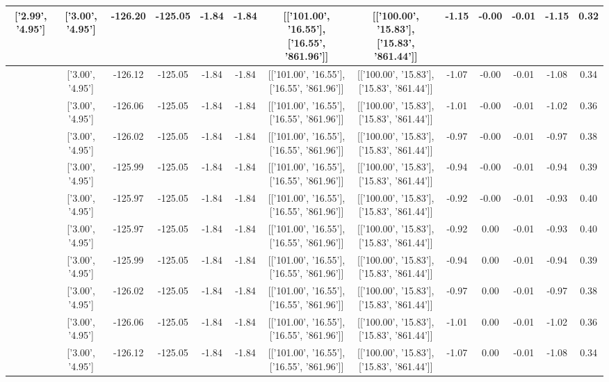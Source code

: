 \begin{table}[htbp]
\begin{adjustbox}{angle=90}
\begin{tabular}{|c|c|c|c|c|c|c|c|c|c|c|c|c|}
 ['2.99', '4.95'] & ['3.00', '4.95'] & -126.20 & -125.05 & -1.84 & -1.84 & [['101.00', '16.55'], ['16.55', '861.96']] & [['100.00', '15.83'], ['15.83', '861.44']] & -1.15 & -0.00 & -0.01 & -1.15 & 0.32\\ \hline
 ['2.99', '4.95'] & ['3.00', '4.95'] & -126.12 & -125.05 & -1.84 & -1.84 & [['101.00', '16.55'], ['16.55', '861.96']] & [['100.00', '15.83'], ['15.83', '861.44']] & -1.07 & -0.00 & -0.01 & -1.08 & 0.34\\ \hline
 ['3.00', '4.95'] & ['3.00', '4.95'] & -126.06 & -125.05 & -1.84 & -1.84 & [['101.00', '16.55'], ['16.55', '861.96']] & [['100.00', '15.83'], ['15.83', '861.44']] & -1.01 & -0.00 & -0.01 & -1.02 & 0.36\\ \hline
 ['3.00', '4.95'] & ['3.00', '4.95'] & -126.02 & -125.05 & -1.84 & -1.84 & [['101.00', '16.55'], ['16.55', '861.96']] & [['100.00', '15.83'], ['15.83', '861.44']] & -0.97 & -0.00 & -0.01 & -0.97 & 0.38\\ \hline
 ['3.00', '4.95'] & ['3.00', '4.95'] & -125.99 & -125.05 & -1.84 & -1.84 & [['101.00', '16.55'], ['16.55', '861.96']] & [['100.00', '15.83'], ['15.83', '861.44']] & -0.94 & -0.00 & -0.01 & -0.94 & 0.39\\ \hline
 ['3.00', '4.95'] & ['3.00', '4.95'] & -125.97 & -125.05 & -1.84 & -1.84 & [['101.00', '16.55'], ['16.55', '861.96']] & [['100.00', '15.83'], ['15.83', '861.44']] & -0.92 & -0.00 & -0.01 & -0.93 & 0.40\\ \hline
 ['3.00', '4.95'] & ['3.00', '4.95'] & -125.97 & -125.05 & -1.84 & -1.84 & [['101.00', '16.55'], ['16.55', '861.96']] & [['100.00', '15.83'], ['15.83', '861.44']] & -0.92 & 0.00 & -0.01 & -0.93 & 0.40\\ \hline
 ['3.00', '4.95'] & ['3.00', '4.95'] & -125.99 & -125.05 & -1.84 & -1.84 & [['101.00', '16.55'], ['16.55', '861.96']] & [['100.00', '15.83'], ['15.83', '861.44']] & -0.94 & 0.00 & -0.01 & -0.94 & 0.39\\ \hline
 ['3.00', '4.95'] & ['3.00', '4.95'] & -126.02 & -125.05 & -1.84 & -1.84 & [['101.00', '16.55'], ['16.55', '861.96']] & [['100.00', '15.83'], ['15.83', '861.44']] & -0.97 & 0.00 & -0.01 & -0.97 & 0.38\\ \hline
 ['3.00', '4.95'] & ['3.00', '4.95'] & -126.06 & -125.05 & -1.84 & -1.84 & [['101.00', '16.55'], ['16.55', '861.96']] & [['100.00', '15.83'], ['15.83', '861.44']] & -1.01 & 0.00 & -0.01 & -1.02 & 0.36\\ \hline
 ['3.01', '4.95'] & ['3.00', '4.95'] & -126.12 & -125.05 & -1.84 & -1.84 & [['101.00', '16.55'], ['16.55', '861.96']] & [['100.00', '15.83'], ['15.83', '861.44']] & -1.07 & 0.00 & -0.01 & -1.08 & 0.34\\ \hline

\end{tabular}
\end{adjustbox}
\end{table}
